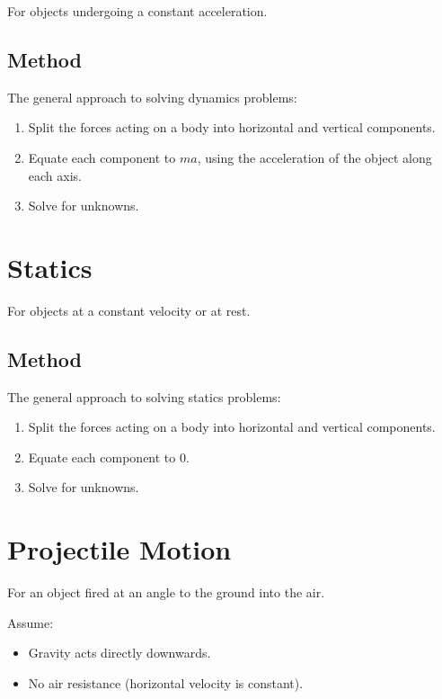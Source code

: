 \documentclass[a4paper,11pt]{article}
\begin{document}
For objects undergoing a constant acceleration.


\subsection{Method}

The general approach to solving dynamics problems:

\begin{enumerate}
\item Split the forces acting on a body into horizontal and vertical components.
\item Equate each component to $ma$, using the acceleration of the object along
	each axis.
\item Solve for unknowns.
\end{enumerate}



\section{Statics}

For objects at a constant velocity or at rest.


\subsection{Method}

The general approach to solving statics problems:

\begin{enumerate}
\item Split the forces acting on a body into horizontal and vertical components.
\item Equate each component to 0.
\item Solve for unknowns.
\end{enumerate}




\section{Projectile Motion}

For an object fired at an angle to the ground into the air.

Assume:

\begin{itemize}
\item Gravity acts directly downwards.
\item No air resistance (horizontal velocity is constant).
\end{itemize}
\end{document}
